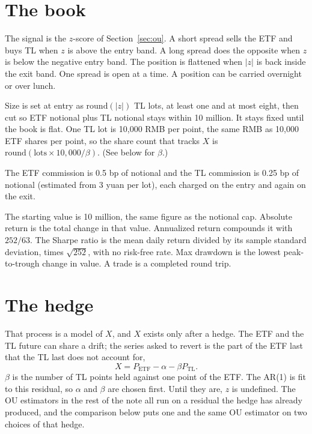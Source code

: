 \documentclass[11pt]{article}
\begin{document}
\section{The book}

The signal is the $z$-score of Section~\ref{sec:ou}. A short spread sells the ETF and buys TL when $z$ is above the entry band. A long spread does the opposite when $z$ is below the negative entry band. The position is flattened when $|z|$ is back inside the exit band. One spread is open at a time. A position can be carried overnight or over lunch.

Size is set at entry as $\mathrm{round}(|z|)$ TL lots, at least one and at most eight, then cut so ETF notional plus TL notional stays within 10 million. It stays fixed until the book is flat. One TL lot is 10{,}000 RMB per point, the same RMB as 10{,}000 ETF shares per point, so the share count that tracks $X$ is $\mathrm{round}(\mathrm{lots}\times 10{,}000/\beta)$. (See below for $\beta$.)

The ETF commission is 0.5 bp of notional and the TL commission is 0.25 bp of notional (estimated from 3 yuan per lot), each charged on the entry and again on the exit.

The starting value is 10 million, the same figure as the notional cap. Absolute return is the total change in that value. Annualized return compounds it with $252/63$. The Sharpe ratio is the mean daily return divided by its sample standard deviation, times $\sqrt{252}$, with no risk-free rate. Max drawdown is the lowest peak-to-trough change in value. A trade is a completed round trip.

\section{The hedge}

That process is a model of $X$, and $X$ exists only after a hedge. The ETF and the TL future can share a drift; the series asked to revert is the part of the ETF last that the TL last does not account for,
\begin{equation}
X = P_{\mathrm{ETF}} - \alpha - \beta P_{\mathrm{TL}}.
\end{equation}
$\beta$ is the number of TL points held against one point of the ETF. The AR(1) is fit to this residual, so $\alpha$ and $\beta$ are chosen first. Until they are, $z$ is undefined. The OU estimators in the rest of the note all run on a residual the hedge has already produced, and the comparison below puts one and the same OU estimator on two choices of that hedge.
\end{document}
